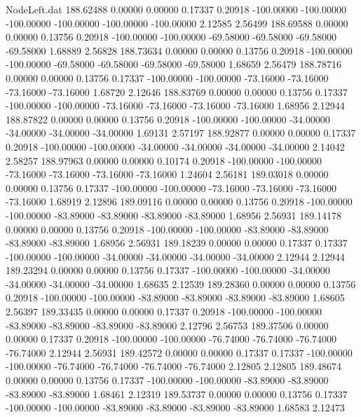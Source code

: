 \begin{filecontents}{NodeLeft.dat}
 188.62488    0.00000    0.00000     0.17337    0.20918 -100.00000 -100.00000 -100.00000 -100.00000 -100.00000 -100.00000    2.12585    2.56499
 188.69588    0.00000    0.00000     0.13756    0.20918 -100.00000 -100.00000  -69.58000  -69.58000  -69.58000  -69.58000    1.68889    2.56828
 188.73634    0.00000    0.00000     0.13756    0.20918 -100.00000 -100.00000  -69.58000  -69.58000  -69.58000  -69.58000    1.68659    2.56479
 188.78716    0.00000    0.00000     0.13756    0.17337 -100.00000 -100.00000  -73.16000  -73.16000  -73.16000  -73.16000    1.68720    2.12646
 188.83769    0.00000    0.00000     0.13756    0.17337 -100.00000 -100.00000  -73.16000  -73.16000  -73.16000  -73.16000    1.68956    2.12944
 188.87822    0.00000    0.00000     0.13756    0.20918 -100.00000 -100.00000  -34.00000  -34.00000  -34.00000  -34.00000    1.69131    2.57197
 188.92877    0.00000    0.00000     0.17337    0.20918 -100.00000 -100.00000  -34.00000  -34.00000  -34.00000  -34.00000    2.14042    2.58257
 188.97963    0.00000    0.00000     0.10174    0.20918 -100.00000 -100.00000  -73.16000  -73.16000  -73.16000  -73.16000    1.24604    2.56181
 189.03018    0.00000    0.00000     0.13756    0.17337 -100.00000 -100.00000  -73.16000  -73.16000  -73.16000  -73.16000    1.68919    2.12896
 189.09116    0.00000    0.00000     0.13756    0.20918 -100.00000 -100.00000  -83.89000  -83.89000  -83.89000  -83.89000    1.68956    2.56931
 189.14178    0.00000    0.00000     0.13756    0.20918 -100.00000 -100.00000  -83.89000  -83.89000  -83.89000  -83.89000    1.68956    2.56931
 189.18239    0.00000    0.00000     0.17337    0.17337 -100.00000 -100.00000  -34.00000  -34.00000  -34.00000  -34.00000    2.12944    2.12944
 189.23294    0.00000    0.00000     0.13756    0.17337 -100.00000 -100.00000  -34.00000  -34.00000  -34.00000  -34.00000    1.68635    2.12539
 189.28360    0.00000    0.00000     0.13756    0.20918 -100.00000 -100.00000  -83.89000  -83.89000  -83.89000  -83.89000    1.68605    2.56397
 189.33435    0.00000    0.00000     0.17337    0.20918 -100.00000 -100.00000  -83.89000  -83.89000  -83.89000  -83.89000    2.12796    2.56753
 189.37506    0.00000    0.00000     0.17337    0.20918 -100.00000 -100.00000  -76.74000  -76.74000  -76.74000  -76.74000    2.12944    2.56931
 189.42572    0.00000    0.00000     0.17337    0.17337 -100.00000 -100.00000  -76.74000  -76.74000  -76.74000  -76.74000    2.12805    2.12805
 189.48674    0.00000    0.00000     0.13756    0.17337 -100.00000 -100.00000  -83.89000  -83.89000  -83.89000  -83.89000    1.68461    2.12319
 189.53737    0.00000    0.00000     0.13756    0.17337 -100.00000 -100.00000  -83.89000  -83.89000  -83.89000  -83.89000    1.68583    2.12473

\end{filecontents}
